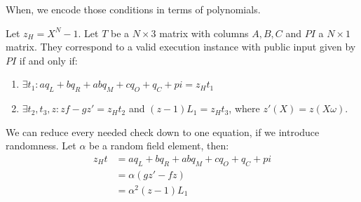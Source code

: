 \documentclass[../lecture-notes.tex]{subfiles}
\begin{document}
When, we encode those conditions in terms of polynomials.

\begin{definition}
Let $z_H = X^N - 1$. Let $T$ be a $N \times 3$ matrix with columns $A, B, C$ and $PI$ a $N \times 1$ matrix. They correspond to a valid execution instance with public input given by $PI$ if and only if:

\begin{enumerate}
    \item \(\exists t_1: aq_L + bq_R + abq_M + cq_O + q_C + pi = z_Ht_1\)
    \item \(\exists t_2, t_3, z: zf - gz' = z_Ht_2\) and \((z-1)L_1 = z_Ht_3\), where $z'(X) = z(X\omega)$.
\end{enumerate}
\end{definition}
\begin{remark}
We can reduce every needed check down to one equation, if we introduce randomness.
Let $\alpha$ be a random field element, then: 
\[
    \begin{aligned}
        z_Ht &= aq_L + bq_R + abq_M + cq_O + q_C + pi \\
        &= \alpha(gz' - fz) \\
        &= \alpha^2(z - 1)L_1
    \end{aligned}
\]
\end{remark}
\end{document}
